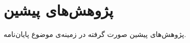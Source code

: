 

\section{
پژوهش‌های پیشین
}

پژوهش‌های پیشین صورت گرفته در زمینه‌ی موضوع پایان‌نامه.













































